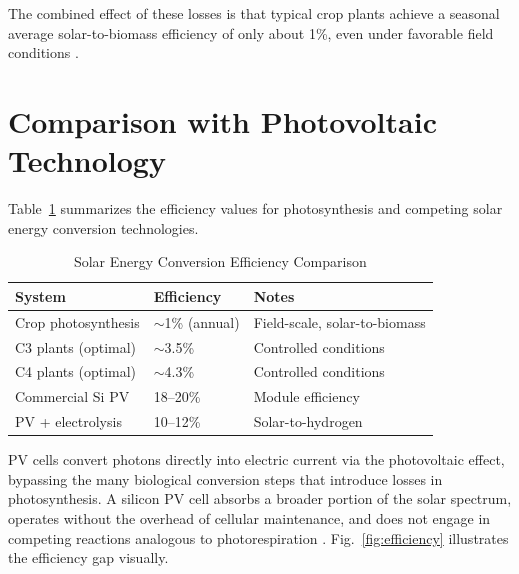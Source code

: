 \documentclass[conference]{IEEEtran}
\begin{document}
The combined effect of these losses is that typical crop plants achieve a seasonal average solar-to-biomass efficiency of only about 1\%, even under favorable field conditions \cite{ars_usda_news}.

\section{Comparison with Photovoltaic Technology}

Table~\ref{tab:efficiency} summarizes the efficiency values for photosynthesis and competing solar energy conversion technologies.

\begin{table}[t]
\caption{Solar Energy Conversion Efficiency Comparison}
\begin{center}
\setlength{\tabcolsep}{4pt}
\begin{tabular}{p{2.4cm}p{1.6cm}p{3.6cm}}
\toprule
\textbf{System} & \textbf{Efficiency} & \textbf{Notes} \\
\midrule
Crop photosynthesis & $\sim$1\% (annual) & Field-scale, solar-to-biomass \cite{ars_usda_news} \\[2pt]
C3 plants (optimal) & $\sim$3.5\% & Controlled conditions \cite{uni_osnabrueck} \\[2pt]
C4 plants (optimal) & $\sim$4.3\% & Controlled conditions \cite{uni_osnabrueck} \\[2pt]
Commercial Si PV & 18--20\% & Module efficiency \cite{uni_osnabrueck} \\[2pt]
PV + electrolysis & 10--12\% & Solar-to-hydrogen \cite{ars_usda_news} \\
\bottomrule
\end{tabular}
\label{tab:efficiency}
\end{center}
\end{table}

PV cells convert photons directly into electric current via the photovoltaic effect, bypassing the many biological conversion steps that introduce losses in photosynthesis. A silicon PV cell absorbs a broader portion of the solar spectrum, operates without the overhead of cellular maintenance, and does not engage in competing reactions analogous to photorespiration \cite{pubmed_comparison}. Fig.~\ref{fig:efficiency} illustrates the efficiency gap visually.
\end{document}
